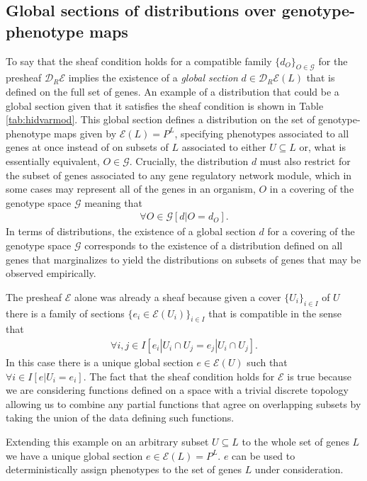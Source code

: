 \documentclass[10pt]{article}
\begin{document}
\subsection*{Global sections of distributions over genotype-phenotype maps}
To say that the sheaf condition holds for a compatible family $\{d_O\}_{O \in \mathcal{G}}$ for the presheaf $\mathcal{D}_R\mathcal{E}$ implies the existence of a \emph{global section} $d \in \mathcal{D}_R\mathcal{E}(L)$ that is defined on the full set of genes. An example of a distribution that could be a global section given that it satisfies the sheaf condition is shown in Table \ref{tab:hidvarmod}. This global section defines a distribution on the set of genotype-phenotype maps given by $\mathcal{E}(L) = P^L$, specifying phenotypes associated to all genes at once instead of on subsets of $L$ associated to either $U \subseteq L$ or, what is essentially equivalent, $O \in \mathcal{G}$. Crucially, the distribution $d$ must also restrict for the subset of genes associated to any gene regulatory network module, which in some cases may represent all of the genes in an organism, $O$ in a covering of the genotype space $\mathcal{G}$ meaning that
\begin{eqnarray}
\forall O \in \mathcal{G} \left[ d|O = d_O \right].
\end{eqnarray}
In terms of distributions, the existence of a global section $d$ for a covering of the genotype space $\mathcal{G}$ corresponds to the existence of a distribution defined on all genes that marginalizes to yield the distributions on subsets of genes that may be observed empirically.

The presheaf $\mathcal{E}$ alone was already a sheaf because given a cover $\{U_i\}_{i \in I}$ of $U$ there is a family of sections $\{e_i \in \mathcal{E}(U_i)\}_{i \in I}$ that is compatible in the sense that
\begin{eqnarray}
\forall i,j \in I \left[ e_i|U_i \cap U_j = e_j|U_i \cap U_j \right].
\end{eqnarray}
In this case there is a unique global section $e \in \mathcal{E}(U)$ such that $\forall i \in I \left[ e|U_i = e_i \right]$. The fact that the sheaf condition holds for $\mathcal{E}$ is true because we are considering functions defined on a space with a trivial discrete topology allowing us to combine any partial functions that agree on overlapping subsets by taking the union of the data defining such functions.

Extending this example on an arbitrary subset $U \subseteq L$ to the whole set of genes $L$ we have a unique global section $e \in \mathcal{E}(L) = P^L$. $e$ can be used to deterministically assign phenotypes to the set of genes $L$ under consideration.
\end{document}

